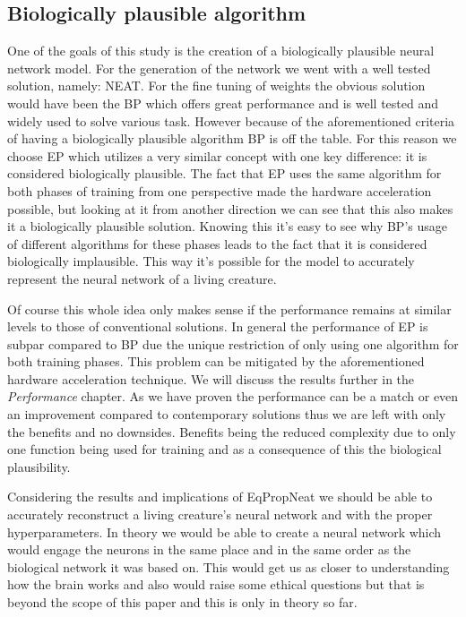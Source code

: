 \documentclass[lettersize,journal]{IEEEtran}
\begin{document}
		\subsection{Biologically plausible algorithm}
		One of the goals of this study is the creation of a biologically plausible neural network model. For the generation of the network we went with a well tested solution, namely: NEAT. For the fine tuning of weights the obvious solution would have been the BP which offers great performance and is well tested and widely used to solve various task. However because of the aforementioned criteria of having a biologically plausible algorithm BP is off the table. For this reason we choose EP which utilizes a very similar concept with one key difference: it is considered biologically plausible. The fact that EP uses the same algorithm for both phases of training from one perspective made the hardware acceleration possible, but looking at it from another direction we can see that this  also makes it a biologically plausible solution. Knowing this it's easy to see why BP's usage of different algorithms for these phases leads to the fact that it is considered biologically implausible. This way it's possible for the model to accurately represent the neural network of a living creature.
		
		Of course this whole idea only makes sense if the performance remains at similar levels to those of conventional solutions. In general the performance of EP is subpar compared to BP due the unique restriction of only using one algorithm for both training phases. This problem can be mitigated by the aforementioned hardware acceleration technique. We will discuss the results further in the \textit{Performance} chapter. As we have proven the performance can be a match or even an improvement compared to contemporary solutions thus we are left with only the benefits and no downsides. Benefits being the reduced complexity due to only one function being used for training and as a consequence of this the biological plausibility.
		
		Considering the results and implications of EqPropNeat we should be able to accurately reconstruct a living creature's neural network and with the proper hyperparameters. In theory we would be able to create a neural network which would engage the neurons in the same place and in the same order as the biological network it was based on. This would get us as closer to understanding how the brain works and also would raise some ethical questions but that is beyond the scope of this paper and this is only in theory so far.
\end{document}
